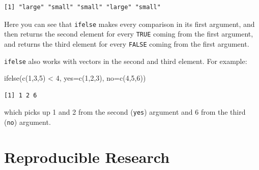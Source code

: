 \documentclass[
  letterpaper,
  DIV=11,
  numbers=noendperiod]{scrreprt}
\newenvironment{Shaded}{\begin{snugshade}}{\end{snugshade}}
\newcommand{\AttributeTok}[1]{\textcolor[rgb]{0.40,0.45,0.13}{#1}}
\newcommand{\ControlFlowTok}[1]{\textcolor[rgb]{0.00,0.23,0.31}{#1}}
\newcommand{\DecValTok}[1]{\textcolor[rgb]{0.68,0.00,0.00}{#1}}
\newcommand{\FunctionTok}[1]{\textcolor[rgb]{0.28,0.35,0.67}{#1}}
\newcommand{\NormalTok}[1]{\textcolor[rgb]{0.00,0.23,0.31}{#1}}
\newcommand{\OtherTok}[1]{\textcolor[rgb]{0.00,0.23,0.31}{#1}}
\newcommand{\SpecialCharTok}[1]{\textcolor[rgb]{0.37,0.37,0.37}{#1}}
\newcommand{\StringTok}[1]{\textcolor[rgb]{0.13,0.47,0.30}{#1}}
\begin{document}
\begin{Shaded}
\end{Shaded}

\begin{verbatim}
[1] "large" "small" "small" "large" "small"
\end{verbatim}

Here you can see that \texttt{ifelse} makes every comparison in its
first argument, and then returns the second element for every
\texttt{TRUE} coming from the first argument, and returns the third
element for every \texttt{FALSE} coming from the first argument.

\texttt{ifelse} also works with vectors in the second and third element.
For example:

\begin{Shaded}
\begin{Highlighting}[]
  \FunctionTok{ifelse}\NormalTok{(}\FunctionTok{c}\NormalTok{(}\DecValTok{1}\NormalTok{,}\DecValTok{3}\NormalTok{,}\DecValTok{5}\NormalTok{) }\SpecialCharTok{\textless{}} \DecValTok{4}\NormalTok{, }\AttributeTok{yes=}\FunctionTok{c}\NormalTok{(}\DecValTok{1}\NormalTok{,}\DecValTok{2}\NormalTok{,}\DecValTok{3}\NormalTok{), }\AttributeTok{no=}\FunctionTok{c}\NormalTok{(}\DecValTok{4}\NormalTok{,}\DecValTok{5}\NormalTok{,}\DecValTok{6}\NormalTok{))}
\end{Highlighting}
\end{Shaded}

\begin{verbatim}
[1] 1 2 6
\end{verbatim}

which picks up 1 and 2 from the second (\texttt{yes}) argument and 6
from the third (\texttt{no}) argument.

\section{Reproducible Research}\label{reproducible-research}
\end{document}
